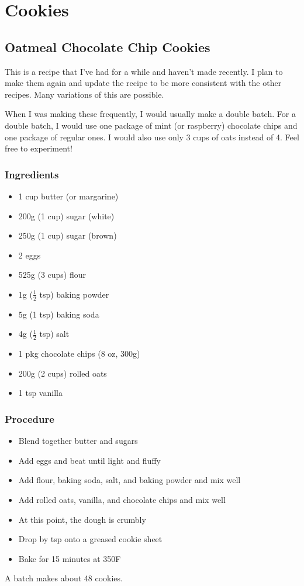 \documentclass[10pt, openany]{book}
\begin{document}
\chapter{Cookies}

\section{Oatmeal Chocolate Chip Cookies}
This is a recipe that I've had for a while and haven't made recently.  I plan to make them again and update the recipe to be more consistent with the other recipes.  Many variations of this are possible.

When I was making these frequently, I would usually make a double batch.  For a double batch, I would use one package of mint (or raspberry) chocolate chips and one package of regular ones.  I would also use only 3 cups of oats instead of 4.  Feel free to experiment!
\subsection{Ingredients}
\begin{itemize}
  \item 1 cup butter (or margarine)
  \item 200g (1 cup) sugar (white)
  \item 250g (1 cup) sugar (brown)
  \item 2 eggs
  \item 525g (3 cups) flour
  \item 1g ($\frac{1}{2}$ tsp) baking powder
  \item 5g (1 tsp) baking soda
  \item 4g ($\frac{1}{2}$ tsp) salt
  \item 1 pkg chocolate chips (8 oz, 300g)
  \item 200g (2 cups) rolled oats
  \item 1 tsp vanilla
\end{itemize}
\subsection{Procedure}
\begin{itemize}
  \item Blend together butter and sugars
  \item Add eggs and beat until light and fluffy
  \item Add flour, baking soda, salt, and baking powder and mix well
  \item Add rolled oats, vanilla, and chocolate chips and mix well
  \item At this point, the dough is crumbly
  \item Drop by tsp onto a greased cookie sheet
  \item Bake for 15 minutes at 350\degree{}F
\end{itemize}
A batch makes about 48 cookies.
\end{document}
